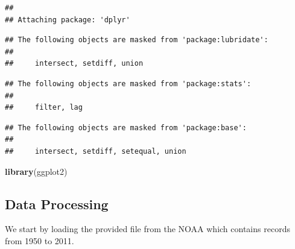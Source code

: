\documentclass[]{article}
\newenvironment{Shaded}{\begin{snugshade}}{\end{snugshade}}
\newcommand{\KeywordTok}[1]{\textcolor[rgb]{0.13,0.29,0.53}{\textbf{{#1}}}}
\newcommand{\StringTok}[1]{\textcolor[rgb]{0.31,0.60,0.02}{{#1}}}
\newcommand{\NormalTok}[1]{{#1}}
\begin{document}
\begin{verbatim}
## 
## Attaching package: 'dplyr'
\end{verbatim}

\begin{verbatim}
## The following objects are masked from 'package:lubridate':
## 
##     intersect, setdiff, union
\end{verbatim}

\begin{verbatim}
## The following objects are masked from 'package:stats':
## 
##     filter, lag
\end{verbatim}

\begin{verbatim}
## The following objects are masked from 'package:base':
## 
##     intersect, setdiff, setequal, union
\end{verbatim}

\begin{Shaded}
\begin{Highlighting}[]
\KeywordTok{library}\NormalTok{(ggplot2)}
\end{Highlighting}
\end{Shaded}

\subsection{Data Processing}\label{data-processing}

We start by loading the provided file from the NOAA which contains
records from 1950 to 2011.

\begin{Shaded}
\end{Shaded}
\end{document}
